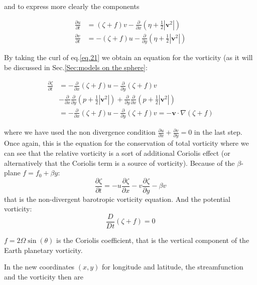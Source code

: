 and to express more clearly the components

\[\begin{aligned}
      \frac{\partial u}{\partial t} &= (\zeta +f) v -\frac{\partial }{\partial x}(\eta+\frac{1}{2}|\mathbf{v}^2|)\\
      \frac{\partial v}{\partial t} &= -(\zeta +f) u -\frac{\partial }{\partial y}(\eta+\frac{1}{2}|\mathbf{v}^2|)
\end{aligned}\]

By taking the curl of eq.\ref{eq.21} we obtain an equation for the vorticity (as it will be discussed in Sec.\ref{Sec:models on the sphere}:

\[\begin{aligned}
      \frac{\partial \zeta}{\partial t} &= -\frac{\partial }{\partial x}(\zeta +f) u -\frac{\partial }{\partial y}(\zeta +f) v  \\
      &-\frac{\partial }{\partial x} \frac{\partial }{\partial y}(p+\frac{1}{2}|\mathbf{v}^2|) +\frac{\partial }{\partial y}\frac{\partial }{\partial x}(p+\frac{1}{2}|\mathbf{v}^2|) \\
      &=  -\frac{\partial }{\partial x}(\zeta +f) u -\frac{\partial }{\partial y}(\zeta +f) v = -\mathbf{v}\cdot\nabla(\zeta +f)
\end{aligned}\]

where we have used the non divergence condition
\(\frac{\partial u}{\partial x}+\frac{\partial v}{\partial y}=0\) in the
last step. Once again, this is the equation for the conservation of
total vorticity where we can see that the relative vorticity is a sort
of additional Coriolis effect (or alternatively that the Coriolis term
is a source of vorticity). Because of the $\beta$-plane $f=f_0+\beta y$:
\begin{equation}\label{Barotropic equation}
\frac{\partial\zeta}{\partial t}=-u\frac{\partial\zeta}{\partial x}-v\frac{\partial\zeta}{\partial y}-\beta v
\end{equation}
that is the non-divergent barotropic vorticity equation. And the potential vorticity:
\begin{equation}\label{eq.potential vorticity}
\frac{D}{Dt}(\zeta +f)=0
\end{equation}

\(f= 2\Omega \sin(\theta)\) is the Coriolis coefficient, that is the
vertical component of the Earth planetary vorticity.

In the new coordinates \((x,y)\) for longitude and latitude, the
streamfunction and the vorticity then are

